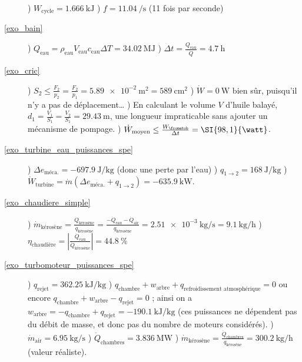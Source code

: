 \begin{description}
				) $W_{\text{cycle}} = \SI{1,666}{\kilo\joule}$
				) $f = \SI{11,04}{\per\second}$ (11 fois par seconde)
	\item [\ref{exo_bain}]
				) $Q_{\text{eau}} = \rho_{\text{eau}} V_{\text{eau}} c_{\text{eau}} \Delta T = \SI{+34,02}{\mega\joule}$
				) $\Delta t = \frac{Q_{\text{eau}}}{\dot Q} = \SI{4,7}{\hour}$
	\item [\ref{exo_cric}] 	
				) $S_2 \leq \frac{F_2}{p_2} = \frac{F_2}{p_1} = \SI{5,89e-2}{\metre\squared} = \SI{589}{\centi\metre\squared}$
				) $\dot W = \SI{0}{\watt}$ bien sûr, puisqu’il n’y a pas de déplacement\ldots
				) En calculant le volume $V$ d’huile balayé, $d_1 = \frac{V_1}{S_1} = \frac{V_2}{S_1} = \SI{29,43}{\metre}$, une longueur impraticable sans ajouter un mécanisme de pompage.
				) $\dot W_{\text{moyen}} \leq \frac{W_\fromatob}{\Delta t} = \SI{98,1}{\watt}$.
	\item [\ref{exo_turbine_eau_puissances_spe}]
				) $\Delta e_{\text{méca.}} = \SI{-697,9}{\joule\per\kilogram}$ (donc une perte par l’eau)
				) $q_{1 \to 2} = \SI{+168}{\joule\per\kilogram}$
				) $\dot W_{\text{turbine}} = \dot m (\Delta e_{\text{méca.}} + q_{1 \to 2} ) = \SI{-635,9}{\kilo\watt}$.
	\item [\ref{exo_chaudiere_simple}] 	
				) $\dot m_{\text{kérosène}} = \frac{\dot Q_{\text{kérosène}}}{q_{\text{kérosène}}} = \frac{-\dot Q_{\text{eau}} - \dot Q_{\text{air}}}{q_{\text{kérosène}}} =  \SI{2,51e-3}{\kilogram\per\second} = \SI{9,1}{\kilogram\per\hour}	$
				) $\eta_{\text{chaudière}} = \left|\frac{\dot Q_{\text{eau}}}{\dot Q_{\text{kérosène}}}\right| = \SI{44,8}{\percent}$
	\item [\ref{exo_turbomoteur_puissances_spe}]
				) $q_{\text{rejet}} = \SI{+362,25}{\kilo\joule\per\kilogram}$
				) $q_{\text{chambre}} + w_{\text{arbre}} + q_{\text{refroidissement atmosphérique}} = 0$ ou encore $q_{\text{chambre}} + w_{\text{arbre}} - q_{\text{rejet}} = 0$ ; ainsi on a $w_{\text{arbre}} = - q_{\text{chambre}} + q_{\text{rejet}} = \SI{-190,1}{\kilo\joule\per\kilogram}$ (ces puissances ne dépendent pas du débit de masse, et donc pas du nombre de moteurs considérés).
				) $\dot m_{\text{air}} = \SI{6,95}{\kilogram\per\second}$
				) $\dot Q_{\text{chambres}} = \SI{3,836}{\mega\watt}$
				) $\dot m_{\text{kérosène}} = \frac{\dot Q_{\text{chambres}}}{q_{\text{kérosène}}} = \SI{300,2}{\kilogram\per\hour}$ (valeur réaliste).
\end{description}

